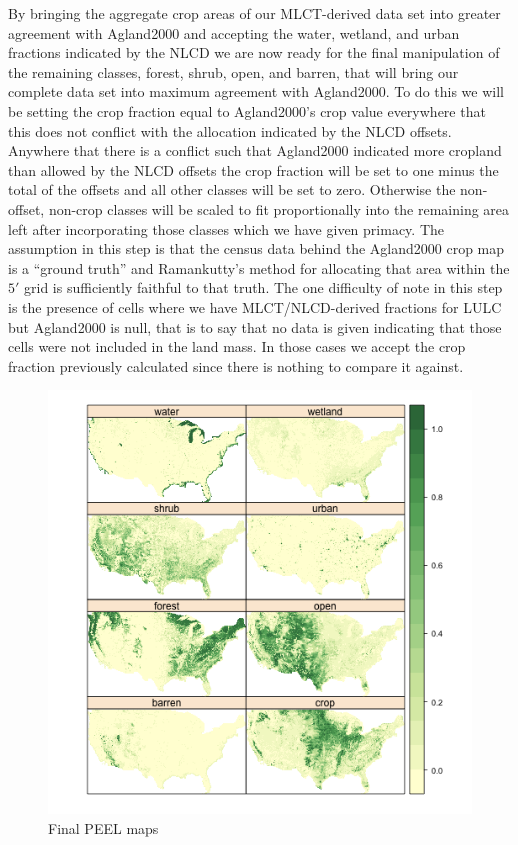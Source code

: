 By bringing the aggregate crop areas of our MLCT-derived data set into
greater agreement with Agland2000 and accepting the water, wetland,
and urban fractions indicated by the NLCD we are now ready for the
final manipulation of the remaining classes, forest, shrub, open, and
barren, that will bring our complete data set into maximum agreement
with Agland2000.  To do this we will be setting the crop fraction
equal to Agland2000's crop value everywhere that this does not
conflict with the allocation indicated by the NLCD offsets.  Anywhere
that there is a conflict such that Agland2000 indicated more cropland
than allowed by the NLCD offsets the crop fraction will be set to one
minus the total of the offsets and all other classes will be set to
zero.  Otherwise the non-offset, non-crop classes will be scaled to
fit proportionally into the remaining area left after incorporating
those classes which we have given primacy.  The assumption in this step
is that the census data behind the Agland2000 crop map is a ``ground
truth'' and Ramankutty's method for allocating that area within the
$5'$ grid is sufficiently faithful to that truth.  The one difficulty
of note in this step is the presence of cells where we have
MLCT/NLCD-derived fractions for LULC but Agland2000 is null, that is
to say that no data is given indicating that those cells were not
included in the land mass.  In those cases we accept the crop fraction
previously calculated since there is nothing to compare it against.


\begin{figure}[ht] 
  \centering


\includegraphics{fig_agc}
\caption{Final PEEL maps} 
\label{fig:agc} 
\end{figure} 

